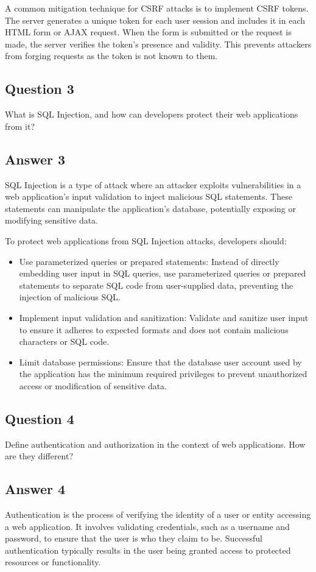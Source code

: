 \documentclass{article}
\begin{document}
A common mitigation technique for CSRF attacks is to implement CSRF tokens. The server generates a unique token for each user session and includes it in each HTML form or AJAX request. When the form is submitted or the request is made, the server verifies the token's presence and validity. This prevents attackers from forging requests as the token is not known to them.

\subsection*{Question 3}
What is SQL Injection, and how can developers protect their web applications from it?

\subsection*{Answer 3}
SQL Injection is a type of attack where an attacker exploits vulnerabilities in a web application's input validation to inject malicious SQL statements. These statements can manipulate the application's database, potentially exposing or modifying sensitive data.

To protect web applications from SQL Injection attacks, developers should:
\begin{itemize}
  \item Use parameterized queries or prepared statements: Instead of directly embedding user input in SQL queries, use parameterized queries or prepared statements to separate SQL code from user-supplied data, preventing the injection of malicious SQL.
  \item Implement input validation and sanitization: Validate and sanitize user input to ensure it adheres to expected formats and does not contain malicious characters or SQL code.
  \item Limit database permissions: Ensure that the database user account used by the application has the minimum required privileges to prevent unauthorized access or modification of sensitive data.
\end{itemize}

\subsection*{Question 4}
Define authentication and authorization in the context of web applications. How are they different?

\subsection*{Answer 4}
Authentication is the process of verifying the identity of a user or entity accessing a web application. It involves validating credentials, such as a username and password, to ensure that the user is who they claim to be. Successful authentication typically results in the user being granted access to protected resources or functionality.
\end{document}
